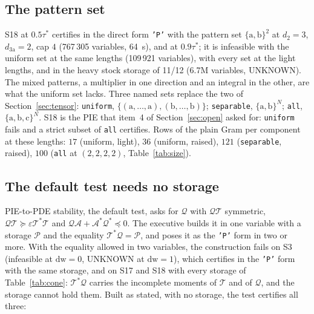 \documentclass[12pt]{article}
\newcommand{\mcl}[1]{\mathcal{#1}}
\newcommand{\code}[1]{\texttt{#1}}
\newcommand{\ba}{\mathrm{a}}
\newcommand{\bb}{\mathrm{b}}
\newcommand{\bc}{\mathrm{c}}
\theoremstyle{plain}
\theoremstyle{definition}
\theoremstyle{remark}
\begin{document}
\subsection{The pattern set}\label{sec:mixed-patterns}

S18 at $0.5\tau^*$ certifies in the direct form \code{'P'} with the pattern set $\{\ba,\bb\}^2$ at $d_2=3$, $d_{3\ba}=2$, cap $4$ (767\,305 variables, 64~s), and at $0.9\tau^*$; it is infeasible with the uniform set at the same lengths (109\,921 variables), with every set at the light lengths, and in the heavy stock storage of 11/12 (6.7M variables, UNKNOWN). The mixed patterns, a multiplier in one direction and an integral in the other, are what the uniform set lacks. Three named sets replace the two of Section~\ref{sec:tensor}: \code{uniform}, $\{(\ba,\dots,\ba),(\bb,\dots,\bb)\}$; \code{separable}, $\{\ba,\bb\}^N$; \code{all}, $\{\ba,\bb,\bc\}^N$. S18 is the PIE that item~4 of Section~\ref{sec:open} asked for: \code{uniform} fails and a strict subset of \code{all} certifies. Rows of the plain Gram per component at these lengths: $17$ (uniform, light), $36$ (uniform, raised), $121$ (\code{separable}, raised), $100$ (\code{all} at $(2,2,2,2)$, Table~\ref{tab:size}).

\subsection{The default test needs no storage}\label{sec:mixed-q}

PIE-to-PDE stability, the default test, asks for $\mcl Q$ with $\mcl Q\mcl T$ symmetric, $\mcl Q\mcl T\succeq\varepsilon\mcl T^*\mcl T$ and $\mcl Q\mcl A+\mcl A^*\mcl Q^*\preceq0$. The executive builds it in one variable with a storage $\mcl P$ and the equality $\mcl T^*\mcl Q=\mcl P$, and poses it as the \code{'P'} form in two or more. With the equality allowed in two variables, the construction fails on S3 (infeasible at $\mathrm{dw}=0$, UNKNOWN at $\mathrm{dw}=1$), which certifies in the \code{'P'} form with the same storage, and on S17 and S18 with every storage of Table~\ref{tab:cone}: $\mcl T^*\mcl Q$ carries the incomplete moments of $\mcl T$ and of $\mcl Q$, and the storage cannot hold them. Built as stated, with no storage, the test certifies all three:
\end{document}
